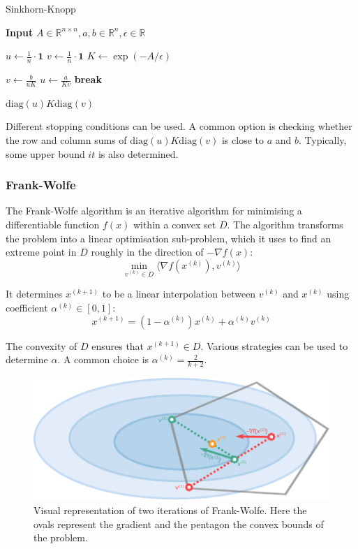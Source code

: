 \begin{algorithm}[H]
\caption{Sinkhorn-Knopp}\label{alg:Sinkhorn-Knopp}
\textbf{Input} $A \in \mathds{R}^{n \times n}, a, b \in \mathds{R}^{n}, \epsilon \in \mathds{R}$
\begin{algorithmic}[1]
\State $u \gets \frac{1}{n} \cdot \boldsymbol{1}$
\State $v \gets \frac{1}{n} \cdot \boldsymbol{1}$
\State $K \gets \exp(-A / \epsilon)$

    \State $v \gets \frac{b}{uK}$
    \State $u \gets \frac{a}{Kv}$
        \State \textbf{break}
    \EndIf
\EndFor

\State \Return $\text{diag}(u) K \text{diag}(v)$

\end{algorithmic}
\end{algorithm}

Different stopping conditions can be used. A common option is checking whether the row and column sums of $\text{diag}(u) K \text{diag}(v)$ is close to $a$ and $b$. Typically, some upper bound $it$ is also determined.

\subsubsection{Frank-Wolfe}
The Frank-Wolfe algorithm \citep{frank1956algorithm} is an iterative algorithm for minimising a differentiable function $f(x)$ within a convex set $D$. The algorithm transforms the problem into a linear optimisation sub-problem, which it uses to find an extreme point in $D$ roughly in the direction of $-\nabla f(x)$:
\begin{equation}
    \min_{v^{(k)} \in D} \langle \nabla f(x^{(k)}), v^{(k)} \rangle
\end{equation}

It determines $x^{(k + 1)}$ to be a linear interpolation between $v^{(k)}$ and $x^{(k)}$ using coefficient $\alpha^{(k)} \in [0, 1]$:
\begin{equation}
    x^{(k + 1)} = (1 - \alpha^{(k)})x^{(k)} + \alpha^{(k)} v^{(k)}
\end{equation}

The convexity of $D$ ensures that $x^{(k + 1)} \in D$. Various strategies can be used to determine $\alpha$. A common choice is $\alpha^{(k)} = \frac{2}{k + 2}$.
\begin{figure}[h]
    \includegraphics[scale=1.5]{figures/frank_wolfe_cropped.pdf}
    \centering
    \caption{Visual representation of two iterations of Frank-Wolfe. Here the ovals represent the gradient and the pentagon the convex bounds of the problem.}
\end{figure}

